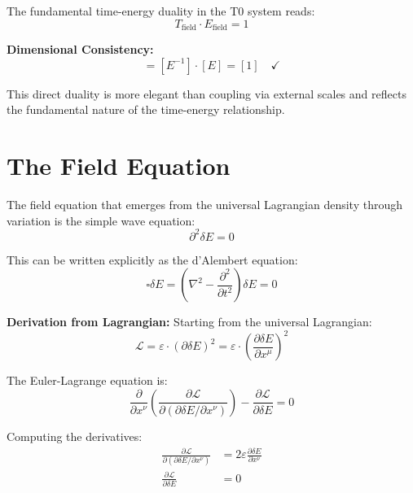 \documentclass[12pt,a4paper]{report}
\begin{document}
	The fundamental time-energy duality in the T0 system reads:
	\begin{equation}
		\boxed{T_{\text{field}} \cdot E_{\text{field}} = 1}
		\label{eq:time_energy_duality}
	\end{equation}
	
	\textbf{Dimensional Consistency:}
	\begin{equation}
		[T_{\text{field}} \cdot E_{\text{field}}] = [E^{-1}] \cdot [E] = [1] \quad \checkmark
	\end{equation}
	
	This direct duality is more elegant than coupling via external scales and reflects the fundamental nature of the time-energy relationship.
	
\section{The Field Equation}

The field equation that emerges from the universal Lagrangian density through variation is the simple wave equation:
\begin{equation}
	\boxed{\partial^2 \delta E = 0}
	\label{eq:field_equation}
\end{equation}

This can be written explicitly as the d'Alembert equation:
\begin{equation}
	\square \delta E = \left(\nabla^2 - \frac{\partial^2}{\partial t^2}\right) \delta E = 0
\end{equation}

\textbf{Derivation from Lagrangian:}
Starting from the universal Lagrangian:
\begin{equation}
	\mathcal{L} = \varepsilon \cdot (\partial\delta E)^2 = \varepsilon \cdot \left(\frac{\partial \delta E}{\partial x^\mu}\right)^2
\end{equation}

The Euler-Lagrange equation is:
\begin{equation}
	\frac{\partial}{\partial x^\nu}\left(\frac{\partial \mathcal{L}}{\partial(\partial \delta E/\partial x^\nu)}\right) - \frac{\partial \mathcal{L}}{\partial \delta E} = 0
\end{equation}

Computing the derivatives:
\begin{align}
	\frac{\partial \mathcal{L}}{\partial(\partial \delta E/\partial x^\nu)} &= 2\varepsilon \frac{\partial \delta E}{\partial x^\nu} \\
	\frac{\partial \mathcal{L}}{\partial \delta E} &= 0
\end{align}
\end{document}
